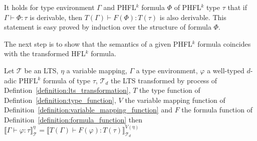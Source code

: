 \begin{remark}
    It holds for type environment $\Gamma$ and PHFL$^k$ formula $\Phi$ of PHFL$^k$ type $\tau$ that if $\Gamma \vdash
    \Phi \colon \tau$ is derivable, then $T(\Gamma) \vdash F(\Phi) \colon T(\tau)$ is also derivable. This statement
    is easy proved by induction over the structure of formula $\Phi$.
\end{remark}

The next step is to show that the semantics of a given PHFL$^k$ formula coincides with the transformed HFL$^k$ formula.

\begin{lemma}
    \label{lemma:model_check_phfl_k}
    Let $\mathcal{T}$ be an LTS, $\eta$ a variable mapping, $\Gamma$ a type environment, $\varphi$ a well-typed $d$-adic
    PHFL$^k$ formula of type $\tau$, $\mathcal{T}_d$ the LTS transformed by process of
    Defintion~\ref{definition:lts_transformation}, $T$ the type function of Defintion~\ref{definition:type_function},
    $V$ the variable mapping function of Definition~\ref{definition:variable_mapping_function}
    and $F$ the formula function of Definition~\ref{definition:formula_function} then $\llbracket \Gamma \vdash
    \varphi \colon \tau \rrbracket^\eta_\mathcal{T} = \llbracket T(\Gamma) \vdash F(\varphi) \colon T(\tau)
    \rrbracket^{V(\eta)}_{\mathcal{T}_d}$
\end{lemma}

